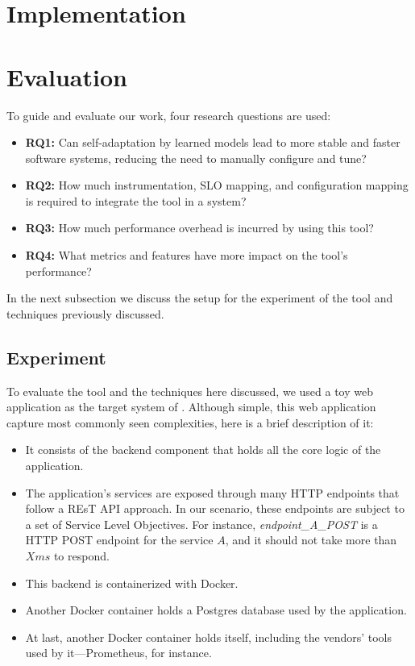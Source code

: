 \section{Implementation}

\section{Evaluation}

To guide and evaluate our work, four research questions are used:

\begin{itemize}
  \item \textbf{RQ1:} Can self-adaptation by learned models lead to more stable and faster software systems, reducing the need to manually configure and tune?
  \item \textbf{RQ2:} How much instrumentation, SLO mapping, and configuration mapping is required to integrate the tool in a system?
  \item \textbf{RQ3:} How much performance overhead is incurred by using this tool?
  \item \textbf{RQ4:} What metrics and features have more impact on the tool's performance?
\end{itemize}

In the next subsection we discuss the setup for the experiment of the tool and techniques previously discussed.

\subsection{Experiment}

To evaluate the tool and the techniques here discussed, we used a toy web application as the target system of \projectname{}. Although simple, this web application capture most commonly seen complexities, here is a brief description of it:

\begin{itemize}
  \item It consists of the backend component that holds all the core logic of the application.
  \item The application's services are exposed through many HTTP endpoints that follow a REsT API approach. In our scenario, these endpoints are subject to a set of Service Level Objectives. For instance, \textit{endpoint\_A\_POST} is a HTTP POST endpoint for the service $A$, and it should not take more than $X ms$ to respond.
  \item This backend is containerized with Docker.
  \item Another Docker container holds a Postgres database used by the application.
  \item At last, another Docker container holds \projectname{} itself, including the vendors' tools used by it---Prometheus, for instance.
\end{itemize}

